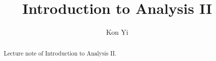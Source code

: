 \documentclass[a4paper]{report}
\author{Kon Yi}
\title{Introduction to Analysis II}
\begin{document}
\maketitle

\begin{abstract}
Lecture note of Introduction to Analysis II.
\end{abstract}

\newpage

\tableofcontents


\newpage
\appendix
\appendixpage{}



\newpage
\pagestyle{plain}
\printbibliography{}
\end{document}
